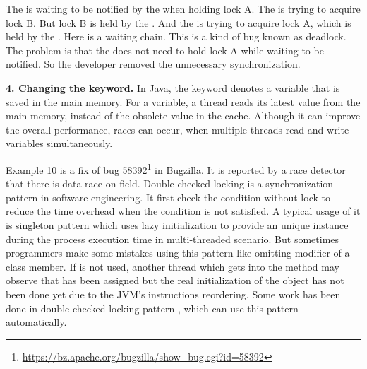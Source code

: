 The  is waiting to be notified by the  when holding lock A. The  is trying to acquire lock B. But lock B is held by the . And the  is trying to acquire lock A, which is held by the . Here is a waiting chain. This is a kind of bug known as deadlock. The problem is that the  does not need to hold lock A while waiting to be notified. So the developer removed the unnecessary synchronization.




\noindent
\textbf{4. Changing the  keyword.} In Java, the  keyword denotes a variable that is saved in the main memory. For a  variable, a thread reads its latest value from the main memory, instead of the obsolete  value in the cache. Although it can improve the overall performance, races can occur, when multiple threads read and write  variables simultaneously.


Example 10 is a fix of bug 58392\footnote{\url{https://bz.apache.org/bugzilla/show_bug.cgi?id=58392}} in Bugzilla. It is reported by a race detector that there is data race on field. Double-checked locking is a synchronization pattern in software engineering. It first check the condition without lock to reduce the time overhead when the condition is not satisfied. A typical usage of it is singleton pattern which uses lazy initialization to provide an unique instance during the process execution time in multi-threaded scenario. But sometimes programmers make some mistakes using this pattern like omitting  modifier of a class member. If  is not used, another thread which gets into the method may observe that  has been assigned but the real initialization of the object has not been done yet due to the JVM's instructions reordering. Some work has been done in double-checked locking pattern \cite{conf/ispass/IshizakiDN14}, which can use this pattern automatically.



